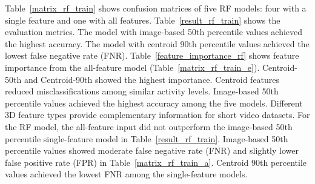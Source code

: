 Table~\ref{matrix_rf_train} shows confusion matrices of five RF models: four with a single feature and one with all features.
Table~\ref{result_rf_train} shows the evaluation metrics.
The model with image-based 50th percentile values achieved the highest accuracy.
The model with centroid 90th percentile values achieved the lowest false negative rate (FNR).
Table~\ref{feature_importance_rf} shows feature importance from the all-feature model (Table~\ref{matrix_rf_train_e}).
Centroid-50th and Centroid-90th showed the highest importance.
Centroid features reduced misclassifications among similar activity levels.
Image-based 50th percentile values achieved the highest accuracy among the five models.
Different 3D feature types provide complementary information for short video datasets.
For the RF model, the all-feature input did not outperform the image-based 50th percentile single-feature model in Table~\ref{result_rf_train}.
Image-based 50th percentile values showed moderate false negative rate (FNR) and slightly lower false positive rate (FPR) in Table~\ref{matrix_rf_train_a}.
Centroid 90th percentile values achieved the lowest FNR among the single-feature models.
